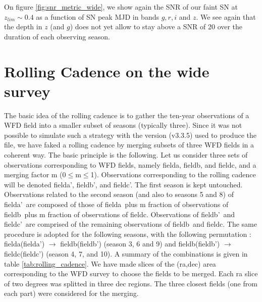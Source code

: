 \documentclass[\docopts]{\docclass}
\newcommand{\fia}{fielda}
\newcommand{\fib}{fieldb}
\newcommand{\fic}{fieldc}
\newcommand{\fiap}{fielda'}
\newcommand{\fibp}{fieldb'}
\newcommand{\ficp}{fieldc'}
\begin{document}
On figure \ref{fig:snr_metric_wide}, we show again the SNR of our
faint SN at $z_{lim} \sim 0.4$ as a function of SN peak MJD in bands
$g, r, i$ and $z$. We see again that the depth in $z$ (and $g$) does
not yet allow to stay above a SNR of 20 over the duration of each
observing season.




\section{Rolling Cadence on the wide survey}
\label{sec:rolling_cadence}

The basic idea of the rolling cadence is to gather the ten-year
observations of a WFD field into a smaller subset of seasons
(typically three). Since it was not possible to simulate such a
strategy with the  version (v3.3.5) used to produce the 
file, we have faked a rolling cadence by merging subsets of three WFD
fields in a coherent way. The basic principle is the following. Let us
consider three sets of observations corresponding to WFD fields,
namely \fia, \fib, and \fic, and a merging factor m
(0$\leq$m$\leq$1).  Observations corresponding to the rolling cadence
will be denoted \fiap, \fibp, and \ficp. The first season is kept
untouched. Observations related to the second season (and also to
seasons 5 and 8) of \fiap~are composed
of those of \fia~plus m fraction of observations of \fib~plus m fraction
of observations of \fic. Observations of \fibp~and \ficp~are comprised of
the remaining observations of \fib~and \fic. The same procedure is
adopted for the following seasons, with the following permutation :
\fia (\fiap) $\rightarrow$ \fib (\fibp) (season 3, 6 and 9) and \fib (\fibp)
$\rightarrow$ \fic (\ficp) (season 4, 7, and 10). A summary of the combinations
is given in  table \ref{tab:rolling_cadence}. We have made slices of
the (ra,dec) area corresponding to the WFD survey to choose the fields
to be merged. Each ra slice of two degrees was splitted in three dec
regions. The three closest fields (one from each part) were considered for the
merging. 
\end{document}

